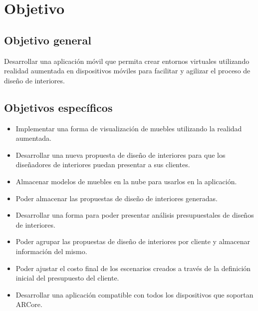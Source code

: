 \section{Objetivo}
\subsection{Objetivo general}
Desarrollar una aplicación móvil que permita crear entornos virtuales utilizando realidad aumentada en dispositivos móviles para facilitar y agilizar el proceso de diseño de interiores.

\subsection{Objetivos específicos}
\begin{itemize}
	\item Implementar una forma de visualización de muebles utilizando la realidad aumentada.
	\item Desarrollar una nueva propuesta de diseño de interiores para que los diseñadores de interiores puedan presentar a sus clientes.
	\item Almacenar modelos de muebles en la nube para usarlos en la aplicación.
	\item Poder almacenar las propuestas de diseño de interiores generadas.
	\item Desarrollar una forma para poder presentar análisis presupuestales de diseños de interiores.
	\item Poder agrupar las propuestas de diseño de interiores por cliente y almacenar información del mismo.
	\item Poder ajustar el costo final de los escenarios creados a través de la definición inicial del presupuesto del cliente.
	\item Desarrollar una aplicación compatible con todos los dispositivos que soportan ARCore.
\end{itemize}
